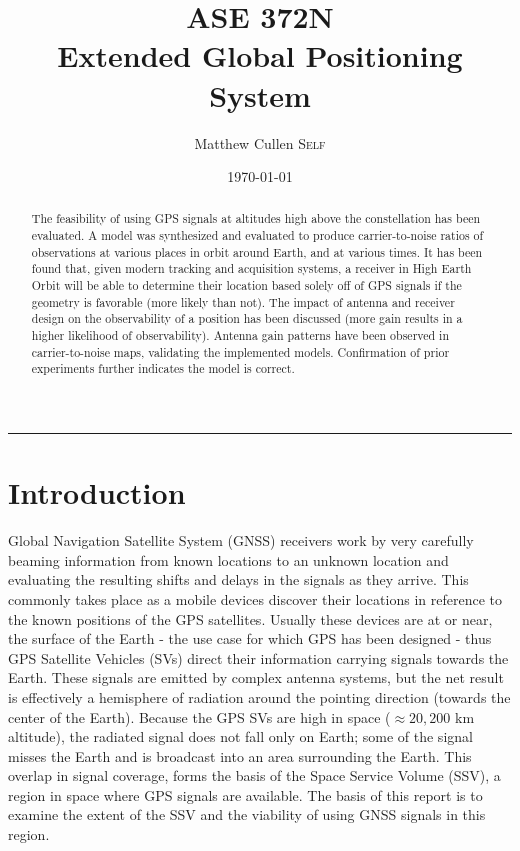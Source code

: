 \documentclass[11pt]{article}
\title{ASE 372N \\ \huge \bfseries Extended Global Positioning System}
\author{\Large Matthew Cullen \textsc{Self}}
\date{\today}
\begin{document}
\maketitle
\hrule
\begin{abstract}
The feasibility of using GPS signals at altitudes high above the constellation has been evaluated. A model was synthesized and evaluated to produce carrier-to-noise ratios of observations at various places in orbit around Earth, and at various times. It has been found that, given modern tracking and acquisition systems, a receiver in High Earth Orbit will be able to determine their location based solely off of GPS signals if the geometry is favorable (more likely than not). The impact of antenna and receiver design on the observability of a position has been discussed (more gain results in a higher likelihood of observability). Antenna gain patterns have been observed in carrier-to-noise maps, validating the implemented models. Confirmation of prior experiments further indicates the model is correct. 
\end{abstract}


\section{Introduction}
Global Navigation Satellite System (GNSS) receivers work by very carefully beaming information from known locations to an unknown location and evaluating the resulting shifts and delays in the signals as they arrive. This commonly takes place as a mobile devices discover their locations in reference to the known positions of the GPS satellites. Usually these devices are at or near, the surface of the Earth - the use case for which GPS has been designed - thus GPS Satellite Vehicles (SVs) direct their information carrying signals towards the Earth. These signals are emitted by complex antenna systems, but the net result is effectively a hemisphere of radiation around the pointing direction (towards the center of the Earth). Because the GPS SVs are high in space ($\approx 20,200$ km altitude), the radiated signal does not fall only on Earth; some of the signal misses the Earth and is broadcast into an area surrounding the Earth. This overlap in signal coverage, forms the basis of the Space Service Volume (SSV), a region in space where GPS signals are available. The basis of this report is to examine the extent of the SSV and the viability of using GNSS signals in this region.
\end{document}
